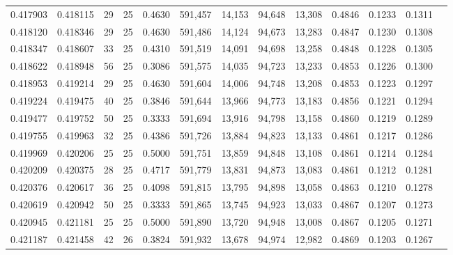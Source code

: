 \begin{tabular}{rrrrrrrrrrrrr}
0.417903 & 0.418115 &    29 &  25 &                                     0.4630 & 591,457 &  14,153 &  94,648 &  13,308 & 0.4846 & 0.1233 & 0.1311 \\
0.418120 & 0.418346 &    29 &  25 &                                     0.4630 & 591,486 &  14,124 &  94,673 &  13,283 & 0.4847 & 0.1230 & 0.1308 \\
0.418347 & 0.418607 &    33 &  25 &                                     0.4310 & 591,519 &  14,091 &  94,698 &  13,258 & 0.4848 & 0.1228 & 0.1305 \\
0.418622 & 0.418948 &    56 &  25 &                                     0.3086 & 591,575 &  14,035 &  94,723 &  13,233 & 0.4853 & 0.1226 & 0.1300 \\
0.418953 & 0.419214 &    29 &  25 &                                     0.4630 & 591,604 &  14,006 &  94,748 &  13,208 & 0.4853 & 0.1223 & 0.1297 \\
0.419224 & 0.419475 &    40 &  25 &                                     0.3846 & 591,644 &  13,966 &  94,773 &  13,183 & 0.4856 & 0.1221 & 0.1294 \\
0.419477 & 0.419752 &    50 &  25 &                                     0.3333 & 591,694 &  13,916 &  94,798 &  13,158 & 0.4860 & 0.1219 & 0.1289 \\
0.419755 & 0.419963 &    32 &  25 &                                     0.4386 & 591,726 &  13,884 &  94,823 &  13,133 & 0.4861 & 0.1217 & 0.1286 \\
0.419969 & 0.420206 &    25 &  25 &                                     0.5000 & 591,751 &  13,859 &  94,848 &  13,108 & 0.4861 & 0.1214 & 0.1284 \\
0.420209 & 0.420375 &    28 &  25 &                                     0.4717 & 591,779 &  13,831 &  94,873 &  13,083 & 0.4861 & 0.1212 & 0.1281 \\
0.420376 & 0.420617 &    36 &  25 &                                     0.4098 & 591,815 &  13,795 &  94,898 &  13,058 & 0.4863 & 0.1210 & 0.1278 \\
0.420619 & 0.420942 &    50 &  25 &                                     0.3333 & 591,865 &  13,745 &  94,923 &  13,033 & 0.4867 & 0.1207 & 0.1273 \\
0.420945 & 0.421181 &    25 &  25 &                                     0.5000 & 591,890 &  13,720 &  94,948 &  13,008 & 0.4867 & 0.1205 & 0.1271 \\
0.421187 & 0.421458 &    42 &  26 &                                     0.3824 & 591,932 &  13,678 &  94,974 &  12,982 & 0.4869 & 0.1203 & 0.1267 \\

\end{tabular}
